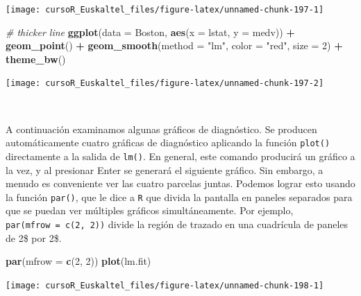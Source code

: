 \documentclass[]{book}
\newenvironment{Shaded}{\begin{snugshade}}{\end{snugshade}}
\newcommand{\KeywordTok}[1]{\textcolor[rgb]{0.13,0.29,0.53}{\textbf{#1}}}
\newcommand{\DataTypeTok}[1]{\textcolor[rgb]{0.13,0.29,0.53}{#1}}
\newcommand{\DecValTok}[1]{\textcolor[rgb]{0.00,0.00,0.81}{#1}}
\newcommand{\StringTok}[1]{\textcolor[rgb]{0.31,0.60,0.02}{#1}}
\newcommand{\CommentTok}[1]{\textcolor[rgb]{0.56,0.35,0.01}{\textit{#1}}}
\newcommand{\OperatorTok}[1]{\textcolor[rgb]{0.81,0.36,0.00}{\textbf{#1}}}
\newcommand{\NormalTok}[1]{#1}
\begin{document}
\begin{center}\texttt{[image: cursoR\_Euskaltel\_files/figure-latex/unnamed-chunk-197-1]} \end{center}

\begin{Shaded}
\begin{Highlighting}[]
\CommentTok{# thicker line}
\KeywordTok{ggplot}\NormalTok{(}\DataTypeTok{data =}\NormalTok{ Boston, }\KeywordTok{aes}\NormalTok{(}\DataTypeTok{x =}\NormalTok{ lstat, }\DataTypeTok{y =}\NormalTok{ medv)) }\OperatorTok{+}
\StringTok{  }\KeywordTok{geom_point}\NormalTok{() }\OperatorTok{+}
\StringTok{  }\KeywordTok{geom_smooth}\NormalTok{(}\DataTypeTok{method =} \StringTok{"lm"}\NormalTok{, }\DataTypeTok{color =} \StringTok{"red"}\NormalTok{, }\DataTypeTok{size =} \DecValTok{2}\NormalTok{) }\OperatorTok{+}
\StringTok{  }\KeywordTok{theme_bw}\NormalTok{()}
\end{Highlighting}
\end{Shaded}

\begin{center}\texttt{[image: cursoR\_Euskaltel\_files/figure-latex/unnamed-chunk-197-2]} \end{center}

~

A continuación examinamos algunas gráficos de diagnóstico. Se producen
automáticamente cuatro gráficas de diagnóstico aplicando la función
\texttt{plot()} directamente a la salida de \texttt{lm()}. En general,
este comando producirá un gráfico a la vez, y al presionar Enter se
generará el siguiente gráfico. Sin embargo, a menudo es conveniente ver
las cuatro parcelas juntas. Podemos lograr esto usando la función
\texttt{par()}, que le dice a \texttt{R} que divida la pantalla en
paneles separados para que se puedan ver múltiples gráficos
simultáneamente. Por ejemplo, \texttt{par(mfrow\ =\ c(2,\ 2))} divide la
región de trazado en una cuadrícula de paneles de 2\$ por 2\$.

\begin{Shaded}
\begin{Highlighting}[]
\KeywordTok{par}\NormalTok{(}\DataTypeTok{mfrow =} \KeywordTok{c}\NormalTok{(}\DecValTok{2}\NormalTok{, }\DecValTok{2}\NormalTok{))}
\KeywordTok{plot}\NormalTok{(lm.fit)}
\end{Highlighting}
\end{Shaded}

\begin{center}\texttt{[image: cursoR\_Euskaltel\_files/figure-latex/unnamed-chunk-198-1]} \end{center}
\end{document}
